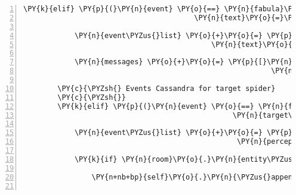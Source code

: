 \begin{Verbatim}[commandchars=\\\{\},numbers=left,firstnumber=1,stepnumber=1]
        \PY{k}{elif} \PY{p}{(}\PY{n}{event} \PY{o}{==} \PY{n}{fabula}\PY{o}{.}\PY{n}{SaysEvent}\PY{p}{(}\PY{n}{identifier}\PY{o}{=}\PY{n}{ID\PYZus{}CASSANDRA}\PY{p}{,}
                                        \PY{n}{text}\PY{o}{=}\PY{l+s}{\PYZsq{}}\PY{l+s}{Würde es dir etwas ausmachen, mich mal kurz durch zu lassen?}\PY{l+s}{\PYZsq{}}\PY{p}{)}\PY{p}{)}\PY{p}{:}

            \PY{n}{event\PYZus{}list} \PY{o}{+}\PY{o}{=} \PY{p}{[}\PY{n}{fabula}\PY{o}{.}\PY{n}{SaysEvent}\PY{p}{(}\PY{n}{identifier}\PY{o}{=}\PY{l+s}{\PYZsq{}}\PY{l+s}{spider}\PY{l+s}{\PYZsq{}}\PY{p}{,}
                                            \PY{n}{text}\PY{o}{=}\PY{l+s}{\PYZsq{}}\PY{l+s}{Würde es dir was ausmachen, wenn ich dich verspeise?}\PY{l+s}{\PYZsq{}}\PY{p}{)}\PY{p}{]}

            \PY{n}{messages} \PY{o}{+}\PY{o}{=} \PY{p}{[}\PY{n}{fabula}\PY{o}{.}\PY{n}{Message}\PY{p}{(}\PY{p}{[}\PY{n}{fabula}\PY{o}{.}\PY{n}{SaysEvent}\PY{p}{(}\PY{n}{identifier}\PY{o}{=}\PY{n}{ID\PYZus{}CASSANDRA}\PY{p}{,}
                                                          \PY{n}{text}\PY{o}{=}\PY{l+s}{\PYZsq{}}\PY{l+s}{Schon, ich geh mal lieber!}\PY{l+s}{\PYZsq{}}\PY{p}{)}\PY{p}{]}\PY{p}{)}\PY{p}{]}

        \PY{c}{\PYZsh{} Events Cassandra for target spider}
        \PY{c}{\PYZsh{}}
        \PY{k}{elif} \PY{p}{(}\PY{n}{event} \PY{o}{==} \PY{n}{fabula}\PY{o}{.}\PY{n}{TriesToLookAtEvent}\PY{p}{(}\PY{n}{identifier}\PY{o}{=}\PY{n}{ID\PYZus{}CASSANDRA}\PY{p}{,}
                                                 \PY{n}{target\PYZus{}identifier}\PY{o}{=}\PY{l+s}{\PYZsq{}}\PY{l+s}{spider}\PY{l+s}{\PYZsq{}}\PY{p}{)}\PY{p}{)}\PY{p}{:}

            \PY{n}{event\PYZus{}list} \PY{o}{+}\PY{o}{=} \PY{p}{[}\PY{n}{fabula}\PY{o}{.}\PY{n}{PerceptionEvent}\PY{p}{(}\PY{n}{identifier}\PY{o}{=}\PY{n}{ID\PYZus{}CASSANDRA}\PY{p}{,}
                                                  \PY{n}{perception}\PY{o}{=}\PY{l+s}{\PYZsq{}}\PY{l+s}{Huch, das ist aber eine Riesenspinne!}\PY{l+s}{\PYZsq{}}\PY{p}{)}\PY{p}{]}

            \PY{k}{if} \PY{n}{room}\PY{o}{.}\PY{n}{entity\PYZus{}locations}\PY{p}{[}\PY{l+s}{\PYZsq{}}\PY{l+s}{spider}\PY{l+s}{\PYZsq{}}\PY{p}{]} \PY{o}{==} \PY{p}{(}\PY{l+m+mi}{1}\PY{p}{,} \PY{l+m+mi}{0}\PY{p}{)}\PY{p}{:}

                \PY{n+nb+bp}{self}\PY{o}{.}\PY{n}{\PYZus{}append\PYZus{}sentence}\PY{p}{(}\PY{n}{ID\PYZus{}CASSANDRA}\PY{p}{,} \PY{l+s}{\PYZsq{}}\PY{l+s}{Die Spinne verbirgt etwas!}\PY{l+s}{\PYZsq{}}\PY{p}{)}


\end{Verbatim}
